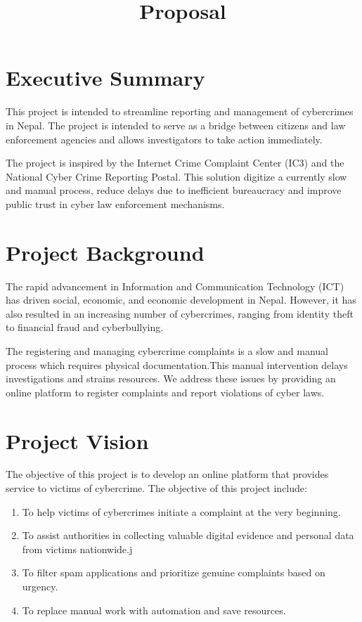 \documentclass[11pt]{article}
\date{}
\title{Proposal}
\begin{document}
\maketitle
\section{Executive Summary}
\label{sec:orge0d542d}
This project is intended to streamline reporting and management of cybercrimes in Nepal. The project is intended to serve as a bridge between citizens and law enforcement agencies and allows investigators to take action immediately.

The project is inspired by the Internet Crime Complaint Center (IC3) and the National Cyber Crime Reporting Postal. This solution digitize a currently slow and manual process, reduce delays due to inefficient bureaucracy and improve public trust in cyber law enforcement mechanisms.
\section{Project Background}
\label{sec:orgfc0476d}
The rapid advancement in Information and Communication Technology (ICT) has driven social, economic, and economic development in Nepal. However, it has also resulted in an increasing number of cybercrimes, ranging from identity theft to financial fraud and cyberbullying.

The registering and managing cybercrime complaints is a slow and manual process which requires physical documentation.This manual intervention delays investigations and strains resources. We address these issues by providing an online platform to register complaints and report violations of cyber laws.
\section{Project Vision}
\label{sec:orgda3822a}
The objective of this project is to develop an online platform that provides service to victims of cybercrime. The objective of this project include:
\begin{enumerate}
\item To help victims of cybercrimes initiate a complaint at the very beginning.
\item To assist authorities in collecting valuable digital evidence and personal data from victims nationwide.j
\item To filter spam applications and prioritize genuine complaints based on urgency.
\item To replace manual work with automation and save resources.
\end{enumerate}
\end{document}
